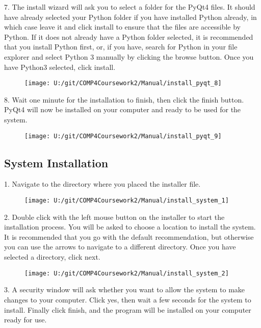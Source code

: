 7. The install wizard will ask you to select a folder for the PyQt4 files. It should have already selected your Python folder if you have installed Python already, in which case leave it and click install to ensure that the files are accessible by Python. If it does not already have a Python folder selected, it is recommended that you install Python first, or, if you have, search for Python in your file explorer and select Python 3 manually by clicking the browse button. Once you have Python3 selected, click install.

\begin{figure}[H]
    \texttt{[image: U:/git/COMP4Coursework2/Manual/install\_pyqt\_8]}
\end{figure}

8. Wait one minute for the installation to finish, then click the finish button. PyQt4 will now be installed on your computer and ready to be used for the system.

\begin{figure}[H]
    \texttt{[image: U:/git/COMP4Coursework2/Manual/install\_pyqt\_9]}
\end{figure}

\subsection{System Installation}

1. Navigate to the directory where you placed the installer file.

\begin{figure}[H]
    \texttt{[image: U:/git/COMP4Coursework2/Manual/install\_system\_1]}
\end{figure}

2. Double click with the left mouse button on the installer to start the installation process. You will be asked to choose a location to install the system. It is recommended that you go with the default recommendation, but otherwise you can use the arrows to navigate to a different directory. Once you have selected a directory, click next.

\begin{figure}[H]
    \texttt{[image: U:/git/COMP4Coursework2/Manual/install\_system\_2]}
\end{figure}

3. A security window will ask whether you want to allow the system to make changes to your computer. Click yes, then wait a few seconds for the system to install. Finally click finish, and the program will be installed on your computer ready for use.

